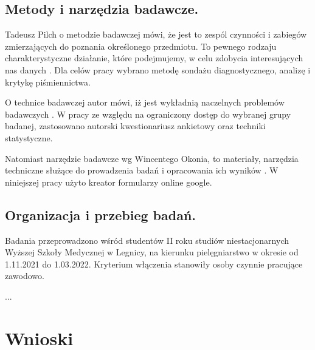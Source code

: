 \documentclass[a4paper,12pt,twoside,openany]{report}
\begin{document}
\section{Metody i narzędzia badawcze.}
Tadeusz Pilch o metodzie badawczej mówi, że jest to zespól czynności i zabiegów zmierzających do poznania określonego przedmiotu. To pewnego rodzaju charakterystyczne działanie, które podejmujemy, w celu zdobycia interesujących nas danych \cite{tadeusz}. Dla celów pracy wybrano metodę sondażu diagnostycznego, analizę i krytykę piśmiennictwa.\cite{krys}

O technice badawczej autor mówi, iż jest wykładnią naczelnych problemów badawczych \cite{tadeusz}. W pracy ze względu na ograniczony dostęp do wybranej grupy badanej, zastosowano autorski kwestionariusz ankietowy oraz techniki statystyczne.

Natomiast narzędzie badawcze wg Wincentego Okonia, to materiały, narzędzia techniczne służące do prowadzenia badań i opracowania ich wyników \cite{winc}. W niniejszej pracy użyto kreator formularzy online google.

\section{Organizacja i przebieg badań.}
Badania przeprowadzono wśród studentów II roku studiów niestacjonarnych Wyższej Szkoły Medycznej w Legnicy, na kierunku pielęgniarstwo w okresie od 1.11.2021 do 1.03.2022. Kryterium włączenia stanowiły osoby czynnie pracujące zawodowo. 

...

\chapter{Wnioski}



\appendix
\end{document}
